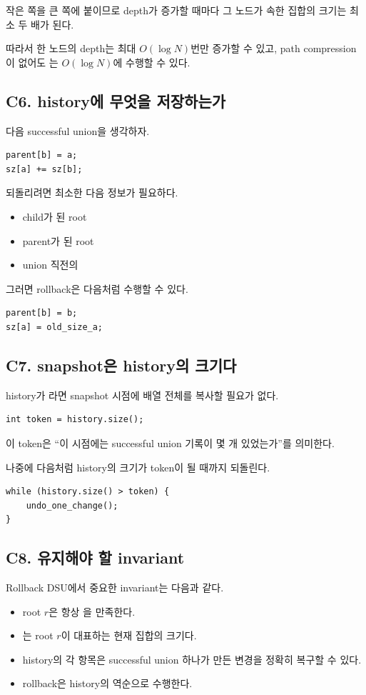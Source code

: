 작은 쪽을 큰 쪽에 붙이므로 depth가 증가할 때마다 그 노드가 속한 집합의 크기는 최소 두 배가 된다.

따라서 한 노드의 depth는 최대 $O(\log N)$번만 증가할 수 있고, path compression이 없어도 는 $O(\log N)$에 수행할 수 있다.

\subsection{C6. history에 무엇을 저장하는가}
다음 successful union을 생각하자.
\begin{lstlisting}
parent[b] = a;
sz[a] += sz[b];
\end{lstlisting}

되돌리려면 최소한 다음 정보가 필요하다.
\begin{itemize}
\item child가 된 root 
\item parent가 된 root 
\item union 직전의 
\end{itemize}

그러면 rollback은 다음처럼 수행할 수 있다.
\begin{lstlisting}
parent[b] = b;
sz[a] = old_size_a;
\end{lstlisting}

\subsection{C7. snapshot은 history의 크기다}
history가 라면 snapshot 시점에 배열 전체를 복사할 필요가 없다.

\begin{lstlisting}
int token = history.size();
\end{lstlisting}

이 token은 ``이 시점에는 successful union 기록이 몇 개 있었는가''를 의미한다.

나중에 다음처럼 history의 크기가 token이 될 때까지 되돌린다.
\begin{lstlisting}
while (history.size() > token) {
    undo_one_change();
}
\end{lstlisting}

\subsection{C8. 유지해야 할 invariant}
Rollback DSU에서 중요한 invariant는 다음과 같다.
\begin{itemize}
\item root $r$은 항상 을 만족한다.
\item {}는 root $r$이 대표하는 현재 집합의 크기다.
\item history의 각 항목은 successful union 하나가 만든 변경을 정확히 복구할 수 있다.
\item rollback은 history의 역순으로 수행한다.
\end{itemize}

